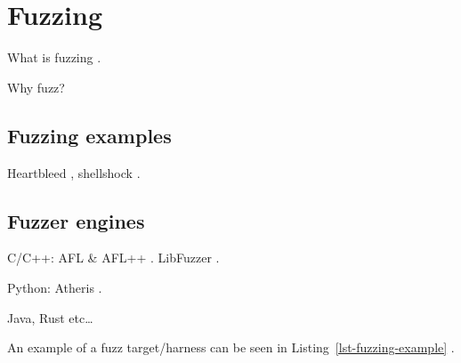 \documentclass[
  a4paper,
  DIV=11,
  numbers=noendperiod]{scrreprt}
\begin{document}
\section{Fuzzing}\label{fuzzing}

What is fuzzing \autocite{manes2019}.

Why fuzz?

\subsection{Fuzzing examples}\label{fuzzing-examples}

Heartbleed \autocite{heartbleed}, shellshock \autocite{meyer2013}.

\subsection{Fuzzer engines}\label{fuzzer-engines}

C/C++: AFL \autocite{afl} \& AFL++ \autocite[++]{afl}. LibFuzzer
\autocite{libfuzzer}.

Python: Atheris \autocite{atheris}.

Java, Rust etc\ldots{}

An example of a fuzz target/harness can be seen in
Listing~\ref{lst-fuzzing-example} \autocite{libfuzzer}.
\end{document}
